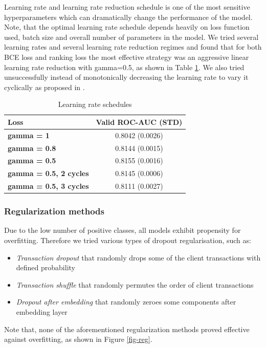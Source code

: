 \documentclass[sigconf]{acmart}
\begin{document}
Learning rate and learning rate reduction schedule is one of the most sensitive hyperparameters which can dramatically change the performance of the model.
Note, that the optimal learning rate schedule depends heavily on loss function used, batch size and overall number of parameters in the model.
We tried several learning rates and several learning rate reduction regimes and found that for both BCE loss and ranking loss the most effective strategy was an aggressive linear learning rate reduction with gamma=0.5, as shown in Table \ref{tab-lr}. We also tried unsuccessfully instead of monotonically decreasing the learning rate to vary it cyclically as proposed in \cite{smith2017cyclical}.

\begin{table}[ht]
\caption{Learning rate schedules}
\begin{tabular}{ | l | c |  }
\hline
\textbf{Loss} & \textbf{Valid ROC-AUC (STD)} \\
\hline
\textbf{gamma = 1} & 0.8042 (0.0026)  \\
\textbf{gamma = 0.8} & 0.8144 (0.0015)  \\
\textbf{gamma = 0.5} & 0.8155 (0.0016)  \\
\textbf{gamma = 0.5, 2 cycles} & 0.8145 (0.0006)  \\
\textbf{gamma = 0.5, 3 cycles} & 0.8111 (0.0027)  \\
\hline
\end{tabular}
\label{tab-lr}
\end{table}

\subsubsection{Regularization methods}

Due to the low number of positive classes, all models exhibit propensity for overfitting. Therefore we tried various types of dropout regularisation, such as:
\begin{itemize}
\item \textit{Transaction dropout} that randomly drops some of the client transactions with defined probability
\item \textit{Transaction shuffle} that randomly permutes the order of client transactions
\item \textit{Dropout after embedding} that randomly zeroes some components after embedding layer
\end{itemize}
Note that, none of the aforementioned regularization methods proved effective against overfitting, as shown in Figure \ref{fig-reg}.
\end{document}

